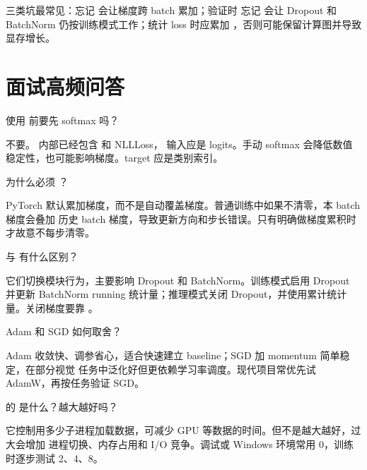 \begin{trap}
三类坑最常见：忘记  会让梯度跨 batch 累加；验证时
忘记  会让 Dropout 和 BatchNorm 仍按训练模式工作；统计 loss
时应累加 ，否则可能保留计算图并导致显存增长。
\end{trap}
\section{面试高频问答}
\begin{interview}
使用  前要先 softmax 吗？
\end{interview}
\begin{answer}
不要。 内部已经包含  和 NLLLoss，
输入应是 logits。手动 softmax 会降低数值稳定性，也可能影响梯度。target 应是类别索引。
\end{answer}
\begin{interview}
为什么必须 ？
\end{interview}
\begin{answer}
PyTorch 默认累加梯度，而不是自动覆盖梯度。普通训练中如果不清零，本 batch 梯度会叠加
历史 batch 梯度，导致更新方向和步长错误。只有明确做梯度累积时才故意不每步清零。
\end{answer}
\begin{interview}
 与  有什么区别？
\end{interview}
\begin{answer}
它们切换模块行为，主要影响 Dropout 和 BatchNorm。训练模式启用 Dropout 并更新
BatchNorm running 统计量；推理模式关闭 Dropout，并使用累计统计量。关闭梯度要靠
。
\end{answer}
\begin{interview}
Adam 和 SGD 如何取舍？
\end{interview}
\begin{answer}
Adam 收敛快、调参省心，适合快速建立 baseline；SGD 加 momentum 简单稳定，在部分视觉
任务中泛化好但更依赖学习率调度。现代项目常优先试 AdamW，再按任务验证 SGD。
\end{answer}
\begin{interview}
 的  是什么？越大越好吗？
\end{interview}
\begin{answer}
它控制用多少子进程加载数据，可减少 GPU 等数据的时间。但不是越大越好，过大会增加
进程切换、内存占用和 I/O 竞争。调试或 Windows 环境常用 0，训练时逐步测试 2、4、8。
\end{answer}
